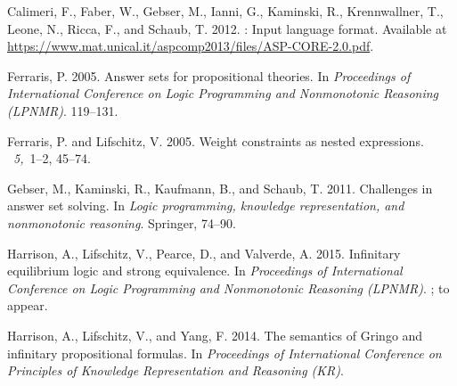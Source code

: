 \documentclass{tlp}
\begin{document}
\begin{thebibliography}{}

{\sc Calimeri, F.}, {\sc Faber, W.}, {\sc Gebser, M.}, {\sc Ianni, G.}, {\sc
  Kaminski, R.}, {\sc Krennwallner, T.}, {\sc Leone, N.}, {\sc Ricca, F.}, {\sc
  and} {\sc Schaub, T.} 2012.
: Input language format.
\newblock Available at
  \url{https://www.mat.unical.it/aspcomp2013/files/ASP-CORE-2.0.pdf}.

{\sc Ferraris, P.} 2005.
\newblock Answer sets for propositional theories.
\newblock In {\em Proceedings of International Conference on Logic Programming
  and Nonmonotonic Reasoning ({LPNMR})}. 119--131.

{\sc Ferraris, P.} {\sc and} {\sc Lifschitz, V.} 2005.
\newblock Weight constraints as nested expressions.
~{\em 5,\/}~1--2,
  45--74.

{\sc Gebser, M.}, {\sc Kaminski, R.}, {\sc Kaufmann, B.}, {\sc and} {\sc
  Schaub, T.} 2011.
\newblock Challenges in answer set solving.
\newblock In {\em Logic programming, knowledge representation, and nonmonotonic
  reasoning}. Springer, 74--90.

{\sc Harrison, A.}, {\sc Lifschitz, V.}, {\sc Pearce, D.}, {\sc and} {\sc
  Valverde, A.} 2015.
\newblock Infinitary equilibrium logic and strong equivalence.
\newblock In {\em Proceedings of International Conference on Logic Programming
  and Nonmonotonic Reasoning ({LPNMR})}.
; to
  appear.

{\sc Harrison, A.}, {\sc Lifschitz, V.}, {\sc and} {\sc Yang, F.} 2014.
\newblock The semantics of {G}ringo and infinitary propositional formulas.
\newblock In {\em Proceedings of International Conference on Principles of
  Knowledge Representation and Reasoning (KR)}.


\end{thebibliography}
\end{document}
